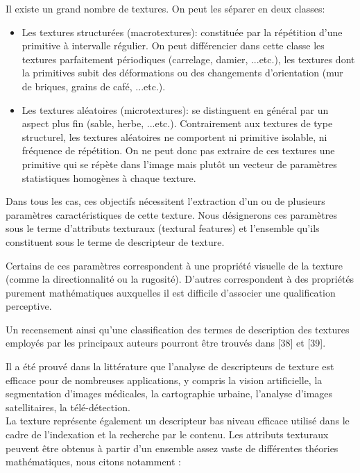 Il existe un grand nombre de textures. On peut les séparer en deux classes:
\begin{itemize}
	\item Les textures
	structurées (macrotextures): constituée par la répétition d’une primitive à intervalle régulier. On peut différencier dans cette classe les textures parfaitement périodiques (carrelage, damier, ...etc.), les textures dont la primitives subit des déformations ou des changements d'orientation (mur de briques, grains de café, ...etc.).
	
	\item Les textures aléatoires (microtextures): se distinguent en général par un aspect plus fin (sable, herbe, ...etc.). Contrairement aux textures de type structurel, les textures aléatoires ne comportent ni primitive isolable, ni fréquence de répétition. On ne peut donc pas extraire de ces textures une primitive qui se répète dans l’image mais plutôt un vecteur de paramètres statistiques homogènes à chaque texture.
\end{itemize}

Dans tous les cas, ces objectifs nécessitent l'extraction d'un ou de plusieurs paramètres caractéristiques de cette texture. Nous désignerons ces paramètres sous le terme d’attributs texturaux (textural features) et l’ensemble qu’ils constituent sous le terme de descripteur de texture.

Certains de ces paramètres correspondent à une propriété visuelle de la texture (comme la directionnalité ou la rugosité). D'autres correspondent à des propriétés purement mathématiques auxquelles il est difficile d'associer une qualification perceptive.

Un recensement ainsi qu'une classification des termes de description des textures employés par les principaux auteurs pourront être trouvés dans [38] et [39].

Il a été prouvé dans la littérature que l'analyse de descripteurs de texture est efficace pour de nombreuses applications, y compris la vision artificielle, la segmentation d'images médicales, la cartographie urbaine, l'analyse d'images satellitaires, la télé-détection.\\

La texture représente également un descripteur bas niveau efficace utilisé dans le cadre de l'indexation et la recherche par le contenu. Les attributs texturaux peuvent être obtenus à partir d’un ensemble assez vaste de différentes théories mathématiques, nous citons notamment :

